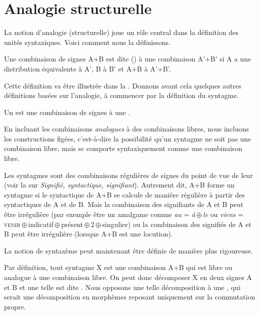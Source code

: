 \section{Analogie structurelle}\label{sec:3.1.2}

La notion d’analogie (structurelle) joue un rôle central dans la définition des unités syntaxiques. Voici comment nous la définissons.

{Une combinaison de signes A+B est dite ()  à une combinaison A’+B’ si A a une distribution équivalente à A’, B à B’ et A+B à A’+B’.}

\begin{sloppypar}
Cette définition va être illustrée dans la . Donnons avant cela quelques autres définitions basées sur l’analogie, à commencer par la définition du syntagme.
\end{sloppypar}

{Un  est une combinaison de signes  à une .}

En incluant les combinaisons \textit{analogues} à des combinaisons libres, nous incluons les constructions figées, c’est-à-dire la possibilité qu’un syntagme ne soit pas une combinaison libre, mais se comporte syntaxiquement comme une combinaison libre.

Les syntagmes sont des combinaisons régulières de signes du point de vue de leur  (voir la  sur \textit{Signifié, syntactique, signifiant}). Autrement dit, A+B forme un syntagme si le syntactique de A+B se calcule de manière régulière à partir des syntactiques de A et de B. Mais la combinaison des signifiants de A et B peut être irrégulière (par exemple être un amalgame comme \textit{au} = \textit{à}\,$\oplus$\,\textit{le} ou \textit{viens} = \textsc{venir}\,$\oplus$\,indicatif\,$\oplus$\,présent\,$\oplus$\,2\,$\oplus$\,singulier) ou la combinaison des signifiés de A et B peut être irrégulière (lorsque A+B est une locution).

La notion de syntaxème peut maintenant être définie de manière plus rigoureuse.

Par définition, tout syntagme X est une combinaison A+B qui est libre ou analogue à une combinaison libre. On peut donc décomposer X en deux signes A et B et une telle  est dite . Nous opposons une telle décomposition à une , qui serait une décomposition en morphèmes reposant uniquement sur la commutation propre.

